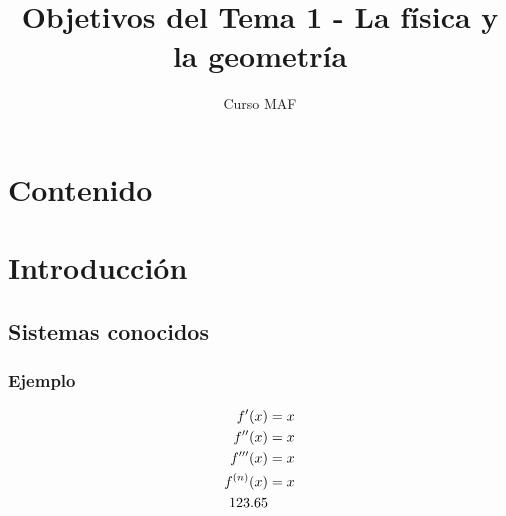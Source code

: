 \documentclass[12pt]{beamer}
\title{\large{Objetivos del Tema 1 - La física y la geometría}}
\subtitle{Curso MAF}
\begin{document}
\maketitle
\fontsize{14}{14}\selectfont
\section*{Contenido}
\section{Introducción}
\subsection{Sistemas conocidos}
\begin{frame}
\frametitle{Ejemplo}
\begin{align*}
{f}^{\prime}(x) &= x \\
{f}^{\prime \prime}(x) &= x \\
{f}^{\prime \prime \prime}(x) &= x \\
{f}^{(n)}(x) &= x \\
123.65
\end{align*}
\end{frame}
\end{document}
